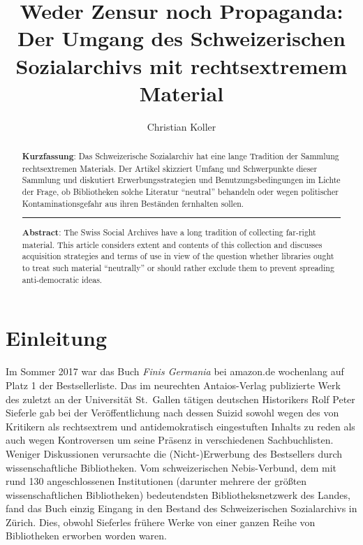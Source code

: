 \documentclass[a4paper,
fontsize=11pt,
oneside,
numbers=noperiodatend,
parskip=half-,
bibliography=totoc,
final
]{scrartcl}
\title{\LARGE{Weder Zensur noch Propaganda: Der Umgang des Schweizerischen Sozialarchivs mit rechtsextremem Material}}%
\author{Christian Koller} %
\date{}
\begin{document}
\maketitle
\thispagestyle{fancyplain} 

\begin{abstract}
\noindent \textbf{Kurzfassung}: Das Schweizerische Sozialarchiv hat eine lange
Tradition der Sammlung rechtsextremen Materials. Der Artikel skizziert
Umfang und Schwerpunkte dieser Sammlung und diskutiert
Erwerbungsstrategien und Benutzungsbedingungen im Lichte der Frage, ob
Bibliotheken solche Literatur \enquote{neutral} behandeln oder wegen politischer
Kontaminationsgefahr aus ihren Beständen fernhalten sollen.

\begin{center}\rule{0.5\linewidth}{\linethickness}\end{center}

\noindent \textbf{Abstract}: The Swiss Social Archives have a long tradition of
collecting far-right material. This article considers extent and
contents of this collection and discusses acquisition strategies and
terms of use in view of the question whether libraries ought to treat
such material \enquote{neutrally} or should rather exclude them to prevent
spreading anti-democratic ideas.
\end{abstract}

\hypertarget{einleitung}{%
\section{Einleitung}\label{einleitung}}

Im Sommer 2017 war das Buch \emph{Finis Germania} bei amazon.de
wochenlang auf Platz 1 der Bestsellerliste. Das im neurechten
Antaios-Verlag publizierte Werk des zuletzt an der Universität
St.~Gallen tätigen deutschen Historikers Rolf Peter Sieferle gab bei der
Veröffentlichung nach dessen Suizid sowohl wegen des von Kritikern als
rechtsextrem und antidemokratisch eingestuften Inhalts zu reden als auch
wegen Kontroversen um seine Präsenz in verschiedenen Sachbuchlisten.
Weniger Diskussionen verursachte die (Nicht-)Erwerbung des Bestsellers
durch wissenschaftliche Bibliotheken. Vom schweizerischen Nebis-Verbund,
dem mit rund 130 angeschlossenen Institutionen (darunter mehrere der
größten wissenschaftlichen Bibliotheken) bedeutendsten
Bibliotheksnetzwerk des Landes, fand das Buch einzig Eingang in den
Bestand des Schweizerischen Sozialarchivs in Zürich. Dies, obwohl
Sieferles frühere Werke von einer ganzen Reihe von Bibliotheken erworben
worden waren.
\end{document}

